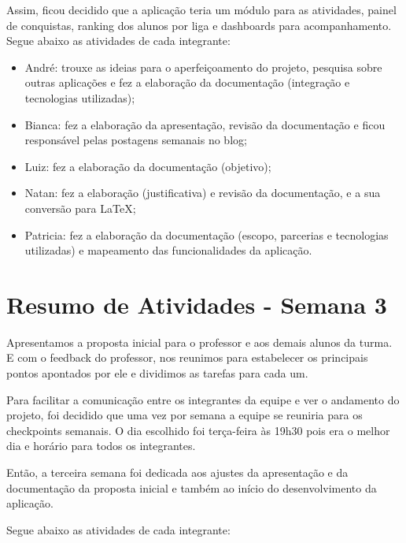 \begin{apendicesenv}
Assim, ficou decidido que a aplicação teria um módulo para as atividades, painel de conquistas, ranking dos alunos por liga e \glspl{dashboard} para acompanhamento.
Segue abaixo as atividades de cada integrante:

\begin{itemize}
\item André: trouxe as ideias para o aperfeiçoamento do projeto, pesquisa sobre outras aplicações e fez a elaboração da documentação (integração e tecnologias utilizadas);
\item Bianca: fez a elaboração da apresentação, revisão da documentação e ficou responsável pelas postagens semanais no blog;
\item Luiz: fez a elaboração da documentação (objetivo);
\item Natan: fez a elaboração (justificativa) e revisão da documentação, e a sua conversão para LaTeX;
\item Patricia: fez a elaboração da documentação (escopo, parcerias e tecnologias utilizadas) e mapeamento das funcionalidades da aplicação.
\end{itemize}

\section{Resumo de Atividades - Semana 3}
Apresentamos a proposta inicial para o professor e aos demais alunos da turma. E com o \gls{feedback} do professor, nos reunimos para estabelecer os principais pontos apontados por ele e dividimos as tarefas para cada um.

Para facilitar a comunicação entre os integrantes da equipe e ver o andamento do projeto, foi decidido que uma vez por semana a equipe se reuniria para os \glspl{checkpoint} semanais. O dia escolhido foi terça-feira às 19h30 pois era o melhor dia e horário para todos os integrantes. 

Então, a terceira semana foi dedicada aos ajustes da apresentação e da documentação da proposta inicial e também ao início do desenvolvimento da aplicação.

Segue abaixo as atividades de cada integrante:


\end{apendicesenv}
